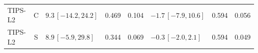 \documentclass[10pt,a4paper]{article}
\begin{document}
\begin{longtable}{lcp{37mm}rrp{37mm}rr}
TIPS-L2 & C & \(9.3\,[-14.2,24.2]\) & 0.469 & 0.104 & \(-1.7\,[-7.9,10.6]\) & 0.594 & 0.056\\
TIPS-L2 & S & \(8.9\,[-5.9,29.8]\) & 0.344 & 0.069 & \(-0.3\,[-2.0,2.1]\) & 0.594 & 0.049\\

\end{longtable}
\end{document}
